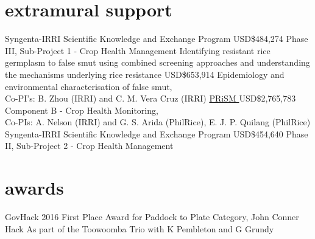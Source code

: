 \section*{extramural support}
  \begin{entrylist}
	 {Syngenta-IRRI Scientific Knowledge and Exchange Program}
	 {USD\$484,274}
	 {Phase III, Sub-Project 1 - Crop Health Management}
   {Identifying resistant rice germplasm to false smut using combined screening approaches and understanding the mechanisms underlying rice resistance}
   {USD\$653,914}
   {Epidemiology and environmental characterisation of false smut,\\Co-PI's: B. Zhou (IRRI) and C. M. {Vera Cruz} (IRRI)}
	 {\href{http://philippinericeinfo.ph/}{PRiSM }}
	 {USD\$2,765,783}
	 {Component B - Crop Health Monitoring,\\Co-PIs: A. Nelson (IRRI) and G. S. Arida (PhilRice), E. J. P. Quilang (PhilRice)}
	  {Syngenta-IRRI Scientific Knowledge and Exchange Program}
	  {USD\$454,640}
	  {Phase II, Sub-Project 2 - Crop Health Management}
  \end{entrylist}

  \section*{awards}
    \begin{entrylist}
    {GovHack 2016 First Place Award for Paddock to Plate Category, John Conner Hack}
    {}
    {As part of the Toowoomba Trio with K Pembleton and G Grundy}      \end{entrylist}
